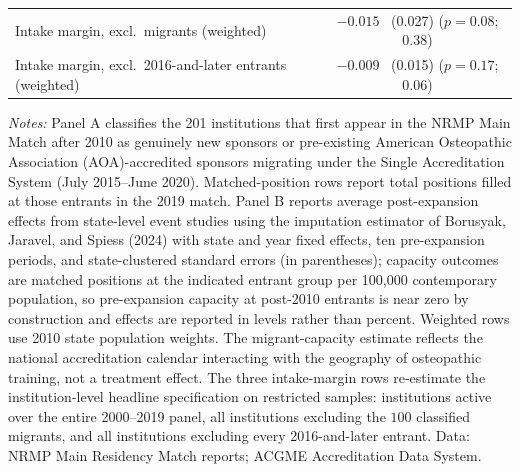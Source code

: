 \begin{table}[H]
\begin{threeparttable}
\begin{tabular}{lcc}
Intake margin, excl.\ migrants (weighted)               & \multicolumn{2}{c}{$-0.015$ \ (0.027) \quad ($p = 0.08$; $0.38$)} \\
Intake margin, excl.\ 2016-and-later entrants (weighted) & \multicolumn{2}{c}{$-0.009$ \ (0.015) \quad ($p = 0.17$; $0.06$)} \\
\bottomrule
\end{tabular}
\begin{tablenotes}\footnotesize
\item \textit{Notes:} Panel A classifies the 201 institutions that first appear in the NRMP Main Match after 2010 as genuinely new sponsors or pre-existing American Osteopathic Association (AOA)-accredited sponsors migrating under the Single Accreditation System (July 2015--June 2020). Matched-position rows report total positions filled at those entrants in the 2019 match. Panel B reports average post-expansion effects from state-level event studies using the imputation estimator of Borusyak, Jaravel, and Spiess (2024) with state and year fixed effects, ten pre-expansion periods, and state-clustered standard errors (in parentheses); capacity outcomes are matched positions at the indicated entrant group per 100{,}000 contemporary population, so pre-expansion capacity at post-2010 entrants is near zero by construction and effects are reported in levels rather than percent. Weighted rows use 2010 state population weights. The migrant-capacity estimate reflects the national accreditation calendar interacting with the geography of osteopathic training, not a treatment effect. The three intake-margin rows re-estimate the institution-level headline specification on restricted samples: institutions active over the entire 2000--2019 panel, all institutions excluding the $100$ classified migrants, and all institutions excluding every 2016-and-later entrant. Data: NRMP Main Residency Match reports; ACGME Accreditation Data System.
\end{tablenotes}
\end{threeparttable}
\end{table}

\ifdim\pagetotal>0pt \clearpage \fi


